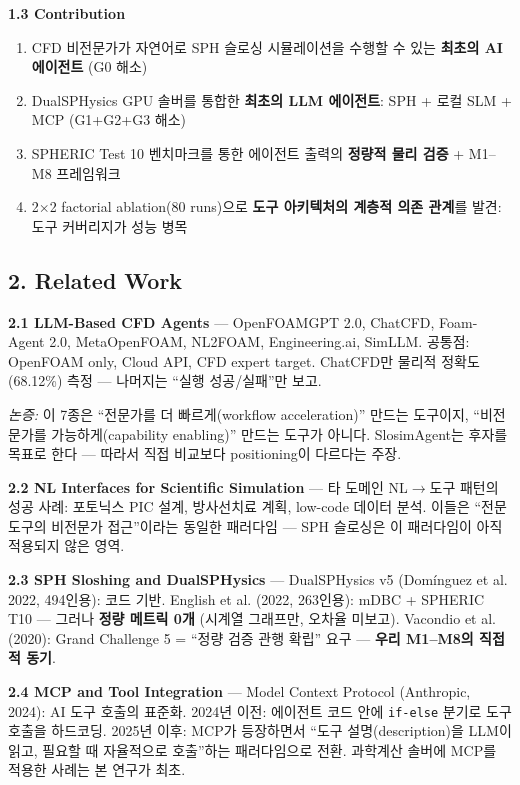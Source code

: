 \documentclass[12pt,a4paper]{article}
\begin{document}
\textbf{1.3 Contribution}

\begin{enumerate}[nosep]
\item CFD 비전문가가 자연어로 SPH 슬로싱 시뮬레이션을 수행할 수 있는 \textbf{최초의 AI 에이전트} (G0 해소)
\item DualSPHysics GPU 솔버를 통합한 \textbf{최초의 LLM 에이전트}: SPH + 로컬 SLM + MCP (G1+G2+G3 해소)
\item SPHERIC Test 10 벤치마크를 통한 에이전트 출력의 \textbf{정량적 물리 검증} + M1--M8 프레임워크
\item 2$\times$2 factorial ablation(80 runs)으로 \textbf{도구 아키텍처의 계층적 의존 관계}를 발견: 도구 커버리지가 성능 병목
\end{enumerate}

\subsection{2. Related Work}

\textbf{2.1 LLM-Based CFD Agents} ---
OpenFOAMGPT 2.0, ChatCFD, Foam-Agent 2.0, MetaOpenFOAM, NL2FOAM, Engineering.ai, SimLLM.
공통점: OpenFOAM only, Cloud API, CFD expert target.
ChatCFD만 물리적 정확도(68.12\%) 측정 --- 나머지는 ``실행 성공/실패''만 보고.

\textit{논증:} 이 7종은 ``전문가를 더 빠르게(workflow acceleration)'' 만드는 도구이지,
``비전문가를 가능하게(capability enabling)'' 만드는 도구가 아니다.
SlosimAgent는 후자를 목표로 한다 --- 따라서 직접 비교보다 positioning이 다르다는 주장.

\textbf{2.2 NL Interfaces for Scientific Simulation} ---
타 도메인 NL$\rightarrow$도구 패턴의 성공 사례:
포토닉스 PIC 설계, 방사선치료 계획, low-code 데이터 분석.
이들은 ``전문 도구의 비전문가 접근''이라는 동일한 패러다임 ---
SPH 슬로싱은 이 패러다임이 아직 적용되지 않은 영역.

\textbf{2.3 SPH Sloshing and DualSPHysics} ---
DualSPHysics v5 (Domínguez et al. 2022, 494인용): 코드 기반.
English et al. (2022, 263인용): mDBC + SPHERIC T10 ---
그러나 \textbf{정량 메트릭 0개} (시계열 그래프만, 오차율 미보고).
Vacondio et al. (2020): Grand Challenge 5 = ``정량 검증 관행 확립'' 요구 ---
\textbf{우리 M1--M8의 직접적 동기}.

\textbf{2.4 MCP and Tool Integration} ---
Model Context Protocol (Anthropic, 2024): AI 도구 호출의 표준화.
2024년 이전: 에이전트 코드 안에 \texttt{if-else} 분기로 도구 호출을 하드코딩.
2025년 이후: MCP가 등장하면서 ``도구 설명(description)을 LLM이 읽고,
필요할 때 자율적으로 호출''하는 패러다임으로 전환.
과학계산 솔버에 MCP를 적용한 사례는 본 연구가 최초.
\end{document}
